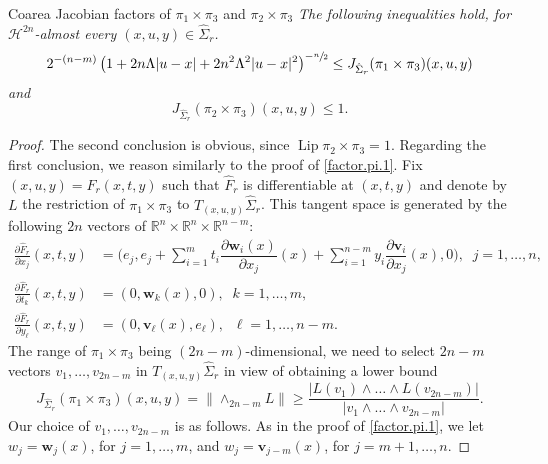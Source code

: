 \documentclass[JEP,XML,SOM,Unicode,ThmDefs,NoEqCountersInSection]{cedram}
\newenvironment{Empty}[2][\null]{%
\begin{enonce}[remark]{#1}#2}
{\end{enonce}}
\newcommand{\R}{\mathbb{R}}
\newcommand{\Rn}{\R^n}
\newcommand{\calH}{\mathscr{H}}
\newcommand{\bv}{{\boldsymbol{v}}}
\newcommand{\bw}{{\boldsymbol{w}}}
\DeclareMathOperator{\rmLip}{\mathrm{Lip}}
\begin{document}
\begin{Empty}[Coarea Jacobian factors of $\pi_1 \times \pi_3$ and $\pi_2 \times \pi_3$]
\label{factor}
{\it
The following inequalities hold, for $\calH^{2n}$-almost every $(x,u,y) \in \hat{\Sigma}_r$.
\begin{equation*}
2^{-(n-m)} \left(1 + 2n\Lambda |u-x| + 2n^2 \Lambda^2 |u-x|^2 \right)^{-\sfrac{n}{2}}
\leq J_{\hat{\Sigma}_r} (\pi_1 \times \pi_3)(x,u,y)
\end{equation*}
and
\begin{equation*}
J_{\hat{\Sigma}_r} (\pi_2 \times \pi_3)(x,u,y) \leq 1.
\end{equation*}
}
\end{Empty}

\begin{proof}
The second conclusion is obvious, since $\rmLip \pi_2 \times \pi_3 = 1$.
Regarding the first conclusion, we reason similarly to the proof of \ref{factor.pi.1}.
Fix $(x,u,y) = \hat{F}_r(x,t,y)$ such that $\hat{F}_r$ is differentiable at $(x,t,y)$ and denote by $L$ the restriction of $\pi_1 \times \pi_3$ to $T_{(x,u,y)}\hat{\Sigma}_r$.
This tangent space is generated by the following $2n$ vectors of $\Rn \times \Rn \times \R^{n-m}$:
\begin{equation*}
\begin{split}
\frac{\partial \hat{F}_r}{\partial x_j}(x,t,y) & = \biggl(e_j, e_j + \sum_{i=1}^m t_i \dfrac{\partial \bw_i(x)}{\partial x_j}(x) + \sum_{i=1}^{n-m} y_i \dfrac{\partial \bv_i}{\partial x_j}(x), 0 \biggr),\;\; j=1,\ldots,n, \\
\frac{\partial \hat{F}_r}{\partial t_k}(x,t,y) & =\left(0, \bw_k(x), 0 \right),\;\; k=1,\ldots,m, \\
\frac{\partial \hat{F}_r}{\partial y_\ell}(x,t,y) & = \left(0, \bv_\ell(x), e_\ell \right),\;\; \ell=1,\ldots,n-m.
\end{split}
\end{equation*}
The range of $\pi_1 \times \pi_3$ being $(2n -m)$-dimensional, we need to select $2n-m$ vectors $v_1,\ldots,v_{2n-m}$ in $ T_{(x,u,y)}\hat{\Sigma}_r$ in view of obtaining a lower bound
\begin{equation}
\label{eq.22}
J_{\hat{\Sigma}_r} (\pi_1 \times \pi_3)(x,u,y) = \|{\wedge}_{2n-m} L \| \geq \frac{|L(v_1) \wedge \ldots \wedge L(v_{2n-m})|}{|v_1 \wedge \ldots \wedge v_{2n-m}|}.
\end{equation}
Our choice of $v_1,\ldots,v_{2n-m}$ is as follows.
As in the proof of \ref{factor.pi.1}, we let $w_j=\bw_j(x)$, for $j=1,\ldots,m$, and $w_j=\bv_{j-m}(x)$, for $j=m+1,\ldots,n$.

\end{proof}
\end{document}
